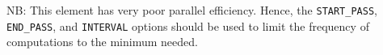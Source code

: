 NB: This element has very poor parallel efficiency. Hence, the \verb|START_PASS|, \verb|END_PASS|, and
\verb|INTERVAL| options should be used to limit the frequency of computations to the minimum needed.

